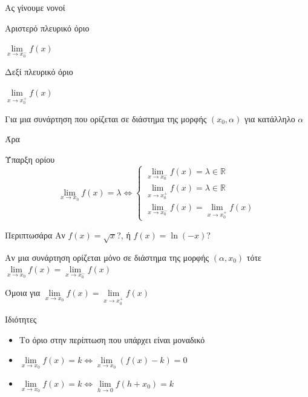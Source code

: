 \documentclass{presentation}
\begin{document}
\begin{frame}{Ας γίνουμε νονοί}
  \begin{block}{Αριστερό πλευρικό όριο}
    \begin{center}
      $\lim\limits_{x \to x_0^-}{ f(x) }$
    \end{center}
  \end{block}
  \begin{block}{Δεξί πλευρικό όριο}
    \begin{center}
      $\lim\limits_{x \to x_0^+}{ f(x) }$
    \end{center}

    Για μια συνάρτηση που ορίζεται σε διάστημα της μορφής $(x_0,α)$ για κατάλληλο $α$
  \end{block}
\end{frame}

\begin{frame}{Άρα}
  \begin{block}{Ύπαρξη ορίου}
    \begin{equation*}
      \lim\limits_{x \to x_0}{ f(x) }=λ\iff
      \begin{cases}
        \lim\limits_{x \to x_0^-}{ f(x) }=λ\in\mathbb{R} \\
        \lim\limits_{x \to x_0^+}{ f(x) }=λ\in\mathbb{R} \\
        \lim\limits_{x \to x_0^-}{ f(x) }=\lim\limits_{x \to x_0^+}{ f(x) }
      \end{cases}
    \end{equation*}
  \end{block}
\end{frame}

\begin{frame}{Περιπτωσάρα}
  Αν $f(x)=\sqrt{x}$?, ή $f(x)=\ln (-x)$?\pause
  \begin{block}{ }
    Αν μια συνάρτηση ορίζεται μόνο σε διάστημα της μορφής $(α,x_0)$ τότε $\lim\limits_{x \to x_0}{ f(x) }=\lim\limits_{x \to x_0^-}{ f(x) }$
  \end{block}\pause
  Όμοια για $\lim\limits_{x \to x_0}{ f(x) }=\lim\limits_{x \to x_0^+}{ f(x) }$
\end{frame}

\begin{frame}{Ιδιότητες}
  \begin{itemize}
    \item Το όριο στην περίπτωση που υπάρχει είναι μοναδικό \pause
    \item $\lim\limits_{x \to x_0}{ f(x) }=k\iff\lim\limits_{x \to x_0}{ \left( f(x)-k \right) }=0$ \pause
    \item $\lim\limits_{x \to x_0}{ f(x) }=k\iff\lim\limits_{h \to 0}{ f(h+x_0) }=k$
  \end{itemize}
\end{frame}
\end{document}
